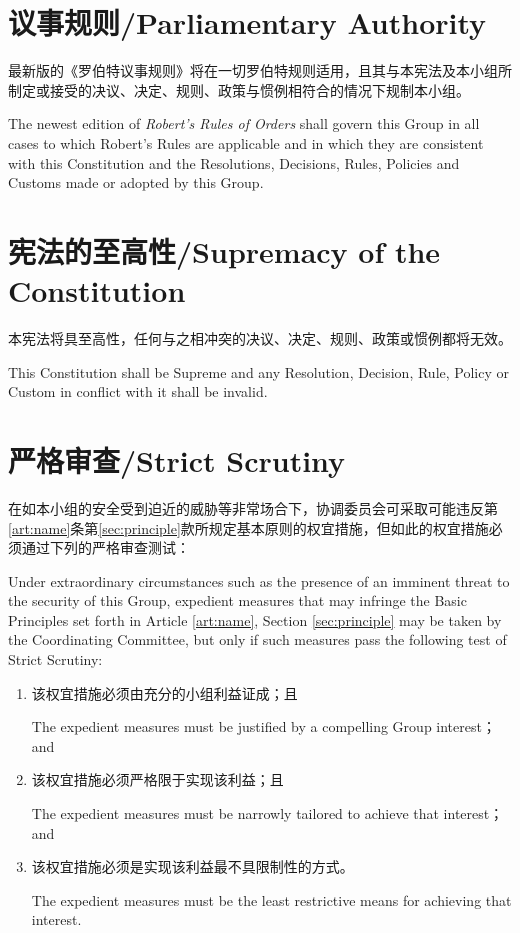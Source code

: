 \documentclass[12pt]{aspasia-constitution}
\begin{document}
	\section{议事规则/Parliamentary Authority}
	
	最新版的《罗伯特议事规则》将在一切罗伯特规则适用，且其与本宪法及本小组所制定或接受的决议、决定、规则、政策与惯例相符合的情况下规制本小组。
	
	The newest edition of \textit{Robert's Rules of Orders} shall govern this Group in all cases to which Robert's Rules are applicable and in which they are consistent with this Constitution and the Resolutions, Decisions, Rules, Policies and Customs made or adopted by this Group.
	
	\section{宪法的至高性/Supremacy of the Constitution}
	
	本宪法将具至高性，任何与之相冲突的决议、决定、规则、政策或惯例都将无效。
	
	This Constitution shall be Supreme and any Resolution, Decision, Rule, Policy or Custom in conflict with it shall be invalid.
	
	\section{严格审查/Strict Scrutiny}
	
	在如本小组的安全受到迫近的威胁等非常场合下，协调委员会可采取可能违反第\ref{art:name}条第\ref{sec:principle}款所规定基本原则的权宜措施，但如此的权宜措施必须通过下列的严格审查测试：
	
	Under extraordinary circumstances such as the presence of an imminent threat to the security of this Group, expedient measures that may infringe the Basic Principles set forth in Article \ref{art:name}, Section \ref{sec:principle} may be taken by the Coordinating Committee, but only if such measures pass the following test of Strict Scrutiny:
	
	\begin{enumerate}[leftmargin=1.25cm]
	\item 该权宜措施必须由充分的小组利益证成；且\par
	The expedient measures must be justified by a compelling Group interest； and
	\item  该权宜措施必须严格限于实现该利益；且\par
	The expedient measures must be narrowly tailored to achieve that interest； and
	\item 该权宜措施必须是实现该利益最不具限制性的方式。\par
	The expedient measures must be the least restrictive means for achieving that interest.
	\end{enumerate}
\end{document}

